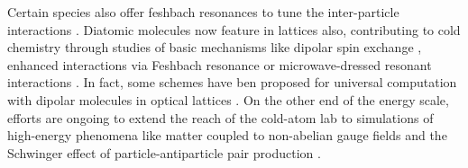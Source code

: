 	Certain species also offer feshbach resonances to tune the inter-particle interactions \cite{Chin10}.
	Diatomic molecules now feature in lattices also, contributing to cold chemistry \cite{Balakrishnan16} through studies of basic mechanisms like dipolar spin exchange \cite{Yan13}, enhanced interactions via Feshbach resonance \cite{Yang19} or microwave-dressed resonant interactions \cite{Yan20}.
	In fact, some schemes have ben proposed for universal computation with dipolar molecules in optical lattices \cite{Yelin06, Micheli06}.
	On the other end of the energy scale, efforts are ongoing to extend the reach of the cold-atom lab to simulations of high-energy phenomena like matter coupled to non-abelian gauge fields \cite{Zohar16,Schweizer19,Tagliacozzo13} and the Schwinger effect of particle-antiparticle pair production \cite{}.	

